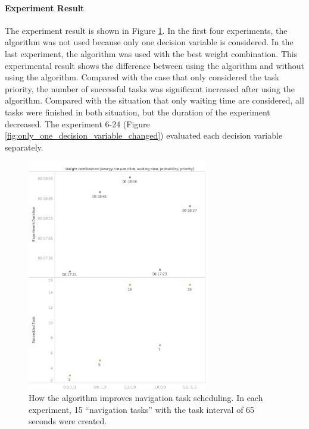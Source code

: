 \paragraph{Experiment Result} 
The experiment result is shown in Figure \ref{fig:improvement_evaluation}. In the first four experiments, the algorithm was not used because only one decision variable is considered. In the last experiment, the algorithm was used with the best weight combination.
 This experimental result shows the difference between using the algorithm and without using the algorithm. Compared with the case that only considered the task priority, the number of successful tasks was significant increased after using the algorithm. Compared with the situation that only waiting time are considered, all tasks were finished in both situation, but the duration of the experiment decreased. 
The experiment 6-24 (Figure \ref{fig:only_one_decision_variable_changed}) evaluated each decision variable separately.

\begin{figure}[htbp]
 \centering
 \includegraphics[width = 0.7\textwidth]{content/images/ch5/improvement_evaluation_65s.png}
 \caption{How the algorithm improves navigation task scheduling. In each experiment, 15 ``navigation tasks'' with the task interval of 65 seconds were created.}
 \label{fig:improvement_evaluation}
\end{figure}

